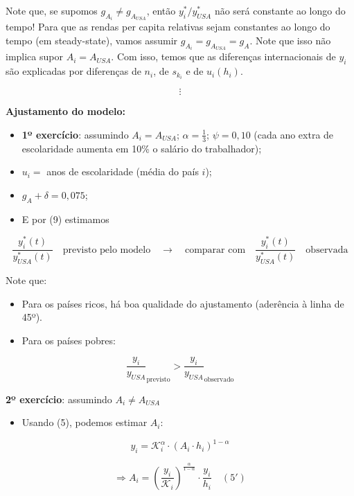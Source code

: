 \documentclass[a4paper,12pt]{article}[abntex2]
\begin{document}
Note que, se supomos \( g_{A_i} \neq g_{A_{USA}} \), então \( y_i^*/y_{USA}^* \) não será constante ao longo do tempo! Para que as rendas per capita relativas sejam constantes ao longo do tempo (em steady-state), vamos assumir \( g_{A_i} = g_{A_{USA}} = g_A \). Note que isso não implica supor \( A_i = A_{USA} \). Com isso, temos que as diferenças internacionais de \( y_i \) são explicadas por diferenças de \( n_i \), de \( s_{k_i} \) e de \( u_i (h_i) \).

\[
\vdots
\]

\textbf{Ajustamento do modelo:}

\begin{itemize}
    \item \textbf{1º exercício}: assumindo \( A_i = A_{USA} \); \( \alpha = \frac{1}{3} \); \( \psi = 0,10 \) (cada ano extra de escolaridade aumenta em 10\% o salário do trabalhador);
    \item \( u_i = \) anos de escolaridade (média do país \( i \));
    \item \( g_A + \delta = 0,075 \);
    \item E por (9) estimamos
\end{itemize}

\[
\frac{y_i^*(t)}{y_{USA}^*(t)} \quad \text{previsto pelo modelo} \quad \longrightarrow \quad \text{comparar com} \quad \frac{y_i^*(t)}{y_{USA}^*(t)} \quad \text{observada}
\]

Note que:

\begin{itemize}
    \item Para os países ricos, há boa qualidade do ajustamento (aderência à linha de 45º).
    \item Para os países pobres:
\end{itemize}

\[
\frac{y_i}{y_{USA}}_{\text{previsto}} > \frac{y_i}{y_{USA}}_{\text{observado}}
\]

\textbf{2º exercício}: assumindo \( A_i \neq A_{USA} \)

\begin{itemize}
    \item Usando (5), podemos estimar \( A_i \):
\end{itemize}

\[
y_i = \mathcal{K}_i^\alpha \cdot (A_i \cdot h_i)^{1-\alpha}
\]

\[
\Rightarrow A_i = \left(\frac{y_i}{\mathcal{K}_i}\right)^{\frac{\alpha}{1-\alpha}} \cdot \frac{y_i}{h_i} \quad (5')
\]
\end{document}
